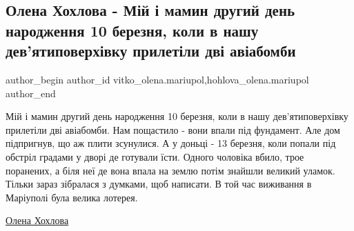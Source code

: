  
 
 
 
 

\subsection{Олена Хохлова - Мій і мамин другий день народження 10 березня, коли в нашу дев'ятиповерхівку прилетіли дві авіабомби}
\label{sec:20_03_2023.fb.vitko_olena.mariupol.1.m_i___mamin_drugii_d}
 
\ifcmt
 author_begin
   author_id vitko_olena.mariupol,hohlova_olena.mariupol
 author_end
\fi

Мій і мамин другий день народження 10 березня, коли в нашу дев'ятиповерхівку
прилетіли дві авіабомби. Нам пощастило  - вони впали під фундамент. Але дом
підпригнув, що аж плити зсунулися. А у доньці - 13 березня, коли попали під
обстріл градами у дворі де готували їсти. Одного чоловіка вбило, трое
поранених, а біля неї де вона впала на землю потім знайшли великий уламок.
Тільки зараз зібралася з думками, щоб написати. В той час виживання в Маріуполі
була велика лотерея.

\href{https://www.facebook.com/AlenaKhokhlova66}{Олена Хохлова}
